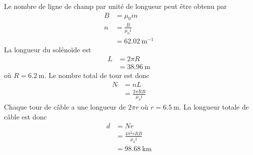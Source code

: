 \begin{reponsebox}
  Le nombre de ligne de champ par unité de longueur peut être obtenu par
  \begin{align*}
    B &= \mu_0 i n  \\
    n &= \frac{B}{\mu_0 i}  \\
      &= \SI{62.02}{\meter^{-1}}
  \end{align*}
  La longueur du solénoïde est
  \begin{align*}
    L &= 2\pi R  \\
      &= \SI{38.96}{\meter}
  \end{align*}
  où $R = \SI{6.2}{\meter}$. Le nombre total de tour est donc
  \begin{align*}
    N &= nL \\
      &= \frac{2\pi R B}{\mu_0 i}
  \end{align*}
  Chaque tour de câble a une longueur de $2\pi r$ où $r = \SI{6.5}{\meter}$. La
  longueur totale de câble est donc
  \begin{align*}
    d &= Nr  \\
      &= \frac{4\pi^2 rR B}{\mu_0 i}  \\
      &= \SI{98.68}{\kilo\meter}
  \end{align*}
\end{reponsebox}
